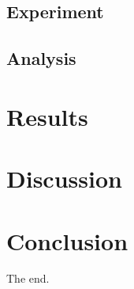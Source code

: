 \documentclass{article}
\begin{document}

\subsection{Experiment}


\subsection{Analysis}


\section{Results}



\section{Discussion}



\section{Conclusion}

The end.

\printbibliography

\appendix
\end{document}
